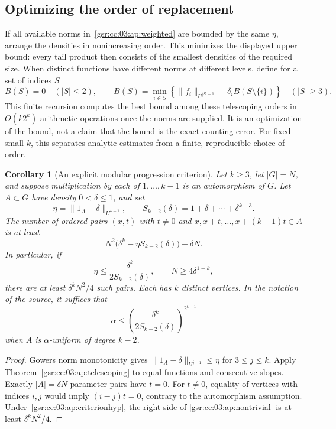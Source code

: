 \documentclass[11pt,letterpaper]{article}
\numberwithin{equation}{section}
\newtheorem{corollary}[theorem]{Corollary}
\theoremstyle{definition}
\theoremstyle{remark}
\newcommand{\1}{\mathbf 1}
\begin{document}
\subsection{Optimizing the order of replacement}

If all available norms in~\eqref{gsr:cc:03:ap:weighted} are bounded by the same
$\eta$, arrange the densities in nonincreasing order. This minimizes the
displayed upper bound: every tail product then consists of the smallest
densities of the required size. When distinct functions have different
norms at different levels, define for a set of indices $S$
\[
 B(S)=0\quad(|S|\le2),\qquad
 B(S)=\min_{i\in S}\left\{\|f_i\|_{U^{|S|-1}}
                                  +\delta_i B(S\setminus\{i\})\right\}
 \quad(|S|\ge3).
\]
This finite recursion computes the best bound among these telescoping
orders in $O(k2^k)$ arithmetic operations once the norms are supplied.
It is an optimization of the bound, not a claim that the bound is the
exact counting error. For fixed small $k$, this separates analytic
estimates from a finite, reproducible choice of order.

\begin{corollary}[An explicit modular progression criterion]
\label{gsr:cc:03:ap:criterion}
Let $k\ge3$, let $|G|=N$, and suppose multiplication by each of
$1,\ldots,k-1$ is an automorphism of $G$. Let $A\subset G$ have
density $0<\delta\le1$, and set
\[
 \eta=\|1_A-\delta\|_{U^{k-1}},\qquad
 S_{k-2}(\delta)=1+\delta+\cdots+\delta^{k-3}.
\]
The number of ordered pairs $(x,t)$ with $t\ne0$ and
$x,x+t,\ldots,x+(k-1)t\in A$ is at least
\begin{equation}
 N^2\bigl(\delta^k-\eta S_{k-2}(\delta)\bigr)-\delta N.
 \label{gsr:cc:03:ap:nontrivial}
\end{equation}
In particular, if
\begin{equation}
 \eta\le\frac{\delta^k}{2S_{k-2}(\delta)},\qquad
 N\ge4\delta^{1-k},
 \label{gsr:cc:03:ap:criterionhyp}
\end{equation}
there are at least $\delta^kN^2/4$ such pairs. Each has $k$ distinct
vertices. In the notation of the source, it suffices that
\[
 \alpha\le
 \left(\frac{\delta^k}{2S_{k-2}(\delta)}\right)^{2^{k-1}}
\]
when $A$ is $\alpha$-uniform of degree $k-2$.
\end{corollary}

\begin{proof}
Gowers norm monotonicity gives $\|1_A-\delta\|_{U^{j-1}}\le\eta$
for $3\le j\le k$. Apply Theorem~\ref{gsr:cc:03:ap:telescoping} to equal
functions and consecutive slopes. Exactly $|A|=\delta N$ parameter
pairs have $t=0$. For $t\ne0$, equality of vertices with indices $i,j$
would imply $(i-j)t=0$, contrary to the automorphism assumption.
Under~\eqref{gsr:cc:03:ap:criterionhyp}, the right side of
\eqref{gsr:cc:03:ap:nontrivial} is at least $\delta^kN^2/4$.
\end{proof}
\end{document}
